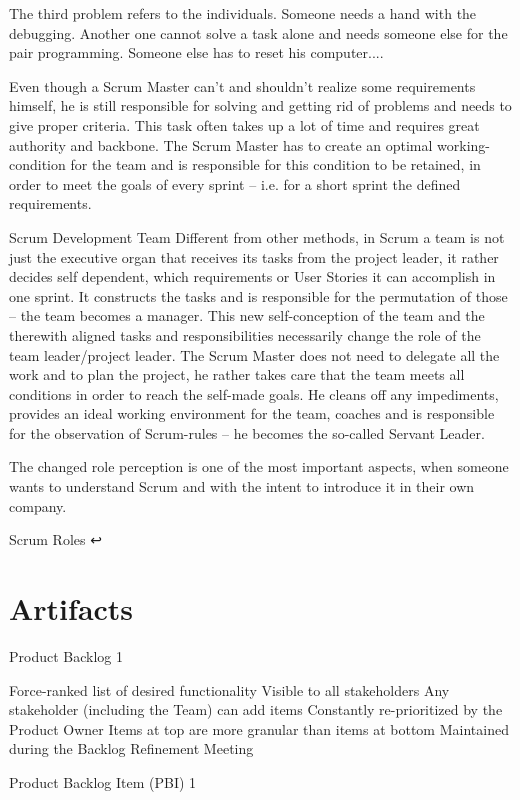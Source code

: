 The third problem refers to the individuals. Someone needs a hand with the debugging. Another one cannot solve a task alone and needs someone else for the pair programming. Someone else has to reset his computer....

Even though a Scrum Master can’t and shouldn’t realize some requirements himself, he is still responsible for solving and getting rid of problems and needs to give proper criteria. This task often takes up a lot of time and requires great authority and backbone. The Scrum Master has to create an optimal working-condition for the team and is responsible for this condition to be retained, in order to meet the goals of every sprint – i.e. for a short sprint the defined requirements.

Scrum Development Team
Different from other methods, in Scrum a team is not just the executive organ that receives its tasks from the project leader, it rather decides self dependent, which requirements or User Stories it can accomplish in one sprint. It constructs the tasks and is responsible for the permutation of those – the team becomes a manager. This new self-conception of the team and the therewith aligned tasks and responsibilities necessarily change the role of the team leader/project leader. The Scrum Master does not need to delegate all the work and to plan the project, he rather takes care that the team meets all conditions in order to reach the self-made goals. He cleans off any impediments, provides an ideal working environment for the team, coaches and is responsible for the observation of Scrum-rules – he becomes the so-called Servant Leader.

The changed role perception is one of the most important aspects, when someone wants to understand Scrum and with the intent to introduce it in their own company.

Scrum Roles ↩

\section{Artifacts}

Product Backlog 1


Force-ranked list of desired functionality
Visible to all stakeholders
Any stakeholder (including the Team) can add items
Constantly re-prioritized by the Product Owner
Items at top are more granular than items at bottom
Maintained during the Backlog Refinement Meeting


Product Backlog Item (PBI) 1


